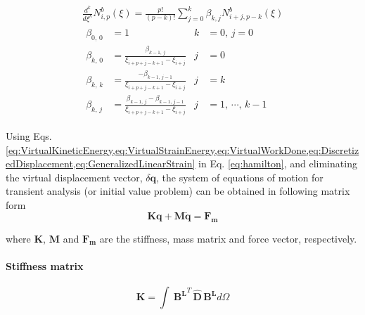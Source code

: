 \documentclass[3p,preprint,12pt]{elsarticle}
\begin{document}
\begin{equation*}
\begin{gathered}
\frac{d^{k}}{d\xi^{k}}N_{i,p}^{b}\left(\xi\right)=\frac{p!}{\left(p-k\right)!}\sum_{j=0}^{k}\beta_{k,j}N_{i+j,p-k}^{b} \left(\xi\right)\\
\begin{aligned}
\beta_{0,\,0}&=1 & k&=0,\,j=0\\
\beta_{k,\,0}&=\frac{\beta_{k-1,\,j}}{\xi_{i+p+j-k+1}-\xi_{i+j}} & j&=0\\
\beta_{k,\,k}&=\frac{-\beta_{k-1,\,j-1}}{\xi_{i+p+j-k+1}-\xi_{i+j}} & j&=k\\
\beta_{k,\,j}&=\frac{\beta_{k-1,\,j}-\beta_{k-1,\,j-1}}{\xi_{i+p+j-k+1}-\xi_{i+j}} & j&=1,\,\cdots,\,k-1
\end{aligned}
\end{gathered}
\end{equation*}

Using  Eqs. \cref{eq:VirtualKineticEnergy,eq:VirtualStrainEnergy,eq:VirtualWorkDone,eq:DiscretizedDisplacement,eq:GeneralizedLinearStrain} in Eq. \cref{eq:hamilton}, and eliminating the virtual displacement vector, $\delta \boldsymbol{q}$, the system of equations of motion for transient analysis (or initial value problem) \cite{krenk2009non} can be obtained in following matrix form
\begin{equation} \label{eq:SystemTransient}
\boldsymbol{K}\boldsymbol{q}+\boldsymbol{M}\boldsymbol{\ddot{q}}=\boldsymbol{F_{m}}
\end{equation}

where $\boldsymbol{K}$, $\boldsymbol{M}$ and $\boldsymbol{F_{m}}$ are the stiffness, mass matrix and force vector, respectively.

\paragraph* {\textbf{Stiffness matrix}}
\begin{equation*}
\boldsymbol{K}=\int\ \boldsymbol{B^{L}}^{T} \,
\boldsymbol{\hat{D}} \, \boldsymbol{B^{L}}  d\Omega
\end{equation*}
\end{document}
